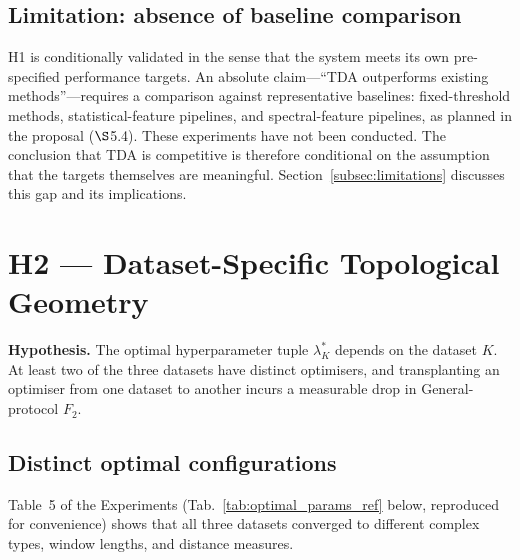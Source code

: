 \documentclass[onluarkali,ingilizce,yukseklisans,karton,LisansustuEgitim]{itutez}
\providecommand{\1}{\mathbf{1}}
\begin{document}
\subsection{Limitation: absence of baseline comparison}

H1 is conditionally validated in the sense that the system meets its own pre-specified
performance targets.  An absolute claim---``TDA outperforms existing methods''---requires
a comparison against representative baselines: fixed-threshold methods, statistical-feature
pipelines, and spectral-feature pipelines, as planned in the proposal ($\S$5.4).  These
experiments have not been conducted.  The conclusion that TDA is competitive is therefore
conditional on the assumption that the targets themselves are meaningful.  Section~\ref{subsec:limitations}
discusses this gap and its implications.

\section{H2 — Dataset-Specific Topological Geometry}
\label{subsec:H2}

\textbf{Hypothesis.}  The optimal hyperparameter tuple $\lambda^*_K$ depends on the
dataset $K$.  At least two of the three datasets have distinct optimisers, and
transplanting an optimiser from one dataset to another incurs a measurable drop in
General-protocol $F_2$.

\subsection{Distinct optimal configurations}

Table~5 of the Experiments (Tab.~\ref{tab:optimal_params_ref} below, reproduced for
convenience) shows that all three datasets converged to different complex types,
window lengths, and distance measures.
\end{document}
